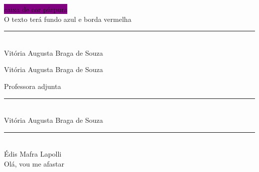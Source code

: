 \documentclass[12pt, a4paper, oneside]{book}
\begin{document}
\colorbox{Purple} {caixa de cor púrpura}\\
 {O texto terá fundo azul e borda vermelha}\\

\newpage

\begin{center}
\rule{10cm} {0.02cm}\\
Vitória Augusta Braga de Souza
\end{center}

Vitória Augusta Braga de Souza

\hrulefill

Professora  adjunta\\

\begin{center}
\rule{10cm} {0.04cm}\\
Vitória Augusta Braga de Souza

\vspace{2.0cm}

\rule{10cm} {0.02cm}\\
Édis Mafra Lapolli\\

Olá,  \hspace{5cm}  vou me afastar
\end{center}


\end{document}
